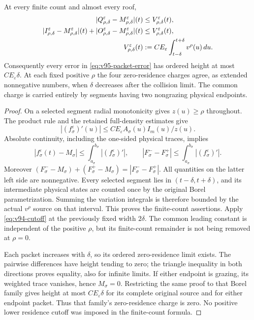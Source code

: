 \begin{theorem}
\label{thm:v95-packets}
At every finite count and almost every roof,
\begin{align}
 |Q_{\rho,\delta}^\varepsilon-M_{\rho,\delta}^\varepsilon|(t)
 &\le V_{\rho,\delta}^\varepsilon(t),\notag\\
 |I_{\rho,\delta}^\varepsilon-M_{\rho,\delta}^\varepsilon|(t)
 +|O_{\rho,\delta}^\varepsilon-M_{\rho,\delta}^\varepsilon|(t)
 &\le V_{\rho,\delta}^\varepsilon(t),\label{eq:v95-packet-error}\\
 V_{\rho,\delta}^\varepsilon(t)
 &:=C E_\varepsilon\int_{t-\delta}^{t+\delta}v^\rho(u)\,du.
 \notag
\end{align}
Consequently every error in \eqref{eq:v95-packet-error} has ordered
height at most $C E_\varepsilon\delta$. At each fixed positive
$\rho$ the four zero-residence charges agree, as extended nonnegative
numbers, when $\delta$ decreases after the collision limit.
The common charge is carried entirely by segments having two
nongrazing physical endpoints.
\end{theorem}
\begin{proof}
On a selected segment radial monotonicity gives $z(u)\ge\rho$
throughout. The product rule and the retained full-density estimates give
\[
 |(f_\sigma^\varepsilon)'(u)|\le C E_\varepsilon A_\sigma(u)I_m(u)/z(u).
\]
Absolute continuity, including the one-sided physical traces, implies
\[
 |f_\sigma^\varepsilon(t)-M_\sigma|
 \le\int_{a_\sigma}^{b_\sigma}|(f_\sigma^\varepsilon)'|,
 \qquad |F_\sigma^--F_\sigma^+|
 \le\int_{a_\sigma}^{b_\sigma}|(f_\sigma^\varepsilon)'|.
\]
Moreover $(F_\sigma^--M_\sigma)+(F_\sigma^+-M_\sigma)
=|F_\sigma^--F_\sigma^+|$. All quantities on the latter left side
are nonnegative. Every selected segment lies in
$(t-\delta,t+\delta)$, and its intermediate physical states are
counted once by the original Borel parametrization. Summing the
variation integrals is therefore bounded by the actual $v^\rho$
source on that interval. This proves the finite-count assertions.
Apply \eqref{eq:v94-cutoff} at the previously fixed width $2\delta$.
The common leading constant is independent of the positive $\rho$,
but its finite-count remainder is not being removed at $\rho=0$.

Each packet increases with $\delta$, so its ordered zero-residence
limit exists. The pairwise differences have height tending to zero;
the triangle inequality in both directions proves equality, also for
infinite limits. If either endpoint is grazing, its weighted trace
vanishes, hence $M_\sigma=0$. Restricting the same proof to that
Borel family gives height at most $C E_\varepsilon\delta$ for
its complete original source and for either endpoint packet.
Thus that family's zero-residence charge is zero. No positive lower
residence cutoff was imposed in the finite-count formula.
\end{proof}

